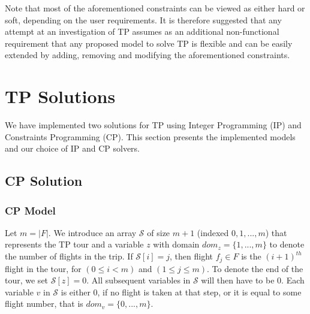 \documentclass{mpaper}
\begin{document}
Note that most of the aforementioned constraints can be viewed as either hard or soft, depending on the user requirements. It is therefore suggested that any attempt at an investigation of TP assumes as an additional non-functional requirement that any proposed model to solve TP is flexible and can be easily extended by adding, removing and modifying the aforementioned constraints.






\section{TP Solutions}
We have implemented two solutions for TP using Integer Programming (IP) and Constraints Programming (CP). This section presents the implemented models and our choice of IP and CP solvers.


\subsection{CP Solution}
\label{subsec:tpcp}

\subsubsection{CP Model}
Let $m = |F|$. We introduce an array $\mathcal{S}$ of size $m+1$ (indexed $0,1,...,m$) that represents the TP tour and a variable $z$ with domain $dom_{z} = \{1,...,m\}$ to denote the number of flights in the trip. If $\mathcal{S}[i] = j$, then flight $f_{j} \in F$ is the $(i+1)^{th}$ flight in the tour, for $(0 \leq i < m)$ and $(1 \leq j \leq m)$. To denote the end of the tour, we set $\mathcal{S}[z] = 0$. All subsequent variables in $\mathcal{S}$ will then have to be 0. Each variable $v$ in $\mathcal{S}$ is either 0, if no flight is taken at that step, or it is equal to some flight number, that is $dom_{v} = \{0,...,m\}$.
\end{document}
